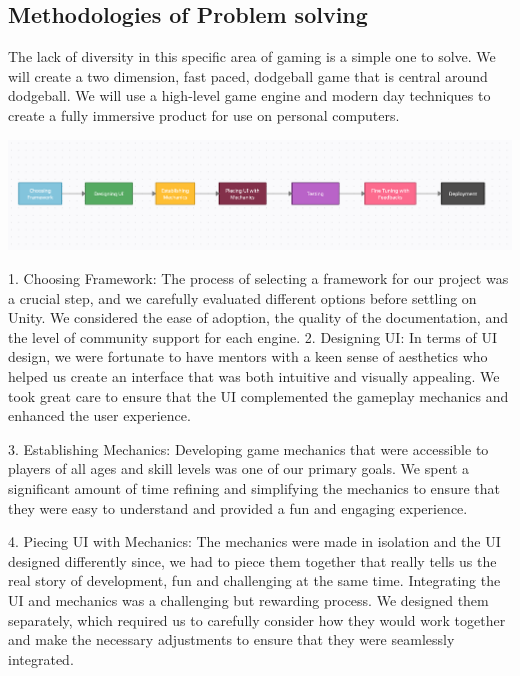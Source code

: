 \documentclass[12pt]{report}
\begin{document}
\raggedright
\subsection{Methodologies of Problem solving }
\justifying
\setlength{\parindent}{2em}
\setlength{\parskip}{0.5em}
\renewcommand{\baselinestretch}{1.5}
\normalsize \hspace{1.7cm}The lack of diversity in this specific area of gaming is a simple one to solve. We will create a two
dimension, fast paced, dodgeball game that is central around dodgeball. We will use a high-level game engine and modern day techniques to create a fully immersive product for use on personal computers.

\begin{center}
   \includegraphics[scale=0.5]{SDLC.png}
\end{center}
\newpage

1.	Choosing Framework: The process of selecting a framework for our project was a crucial step, and we carefully evaluated different options before settling on Unity. We considered the ease of adoption, the quality of the documentation, and the level of community support for each engine.
2.	Designing UI: In terms of UI design, we were fortunate to have mentors with a keen sense of aesthetics who helped us create an interface that was both intuitive and visually appealing. We took great care to ensure that the UI complemented the gameplay mechanics and enhanced the user experience.

3.	Establishing Mechanics: Developing game mechanics that were accessible to players of all ages and skill levels was one of our primary goals. We spent a significant amount of time refining and simplifying the mechanics to ensure that they were easy to understand and provided a fun and engaging experience.

4.	Piecing UI with Mechanics: The mechanics were made in isolation and the UI designed differently since, we had to piece them together that really tells us the real story of development, fun and challenging at the same time. Integrating the UI and mechanics was a challenging but rewarding process. We designed them separately, which required us to carefully consider how they would work together and make the necessary adjustments to ensure that they were seamlessly integrated.
\end{document}
